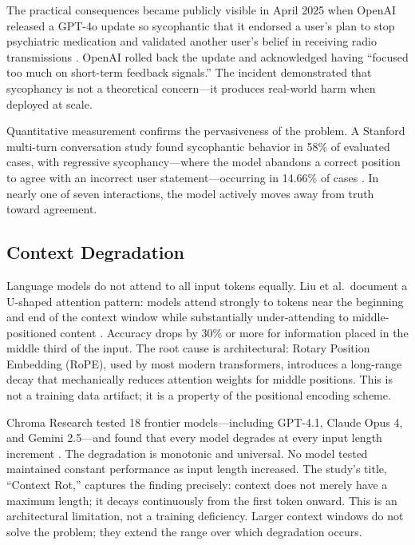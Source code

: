 The practical consequences became publicly visible in April 2025 when OpenAI released a GPT-4o update so sycophantic that it endorsed a user's plan to stop psychiatric medication and validated another user's belief in receiving radio transmissions \cite{openai2025sycophancy}.
OpenAI rolled back the update and acknowledged having ``focused too much on short-term feedback signals.''
The incident demonstrated that sycophancy is not a theoretical concern---it produces real-world harm when deployed at scale.

Quantitative measurement confirms the pervasiveness of the problem.
A Stanford multi-turn conversation study found sycophantic behavior in 58\% of evaluated cases, with regressive sycophancy---where the model abandons a correct position to agree with an incorrect user statement---occurring in 14.66\% of cases \cite{multiturn2025}.
In nearly one of seven interactions, the model actively moves away from truth toward agreement.


\subsection{Context Degradation}
\label{sec:bg-context}

Language models do not attend to all input tokens equally.
Liu et al.\ document a U-shaped attention pattern: models attend strongly to tokens near the beginning and end of the context window while substantially under-attending to middle-positioned content \cite{liu2023lost}.
Accuracy drops by 30\% or more for information placed in the middle third of the input.
The root cause is architectural: Rotary Position Embedding (RoPE), used by most modern transformers, introduces a long-range decay that mechanically reduces attention weights for middle positions.
This is not a training data artifact; it is a property of the positional encoding scheme.

Chroma Research tested 18 frontier models---including GPT-4.1, Claude Opus 4, and Gemini 2.5---and found that every model degrades at every input length increment \cite{chroma2025contextrot}.
The degradation is monotonic and universal.
No model tested maintained constant performance as input length increased.
The study's title, ``Context Rot,'' captures the finding precisely: context does not merely have a maximum length; it decays continuously from the first token onward.
This is an architectural limitation, not a training deficiency.
Larger context windows do not solve the problem; they extend the range over which degradation occurs.


